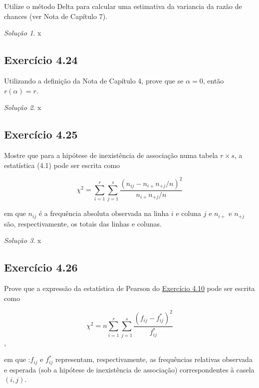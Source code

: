 \documentclass[
]{latex/krantz}
\theoremstyle{definition}
\theoremstyle{definition}
\theoremstyle{definition}
\theoremstyle{definition}
\theoremstyle{remark}
\newtheorem*{solution}{Solução}
\begin{document}
Utilize o método Delta para calcular uma estimativa da variancia da razão de chances (ver Nota de Capítulo 7).

\begin{solution}
x
\end{solution}

\hypertarget{exr4-24}{%
\subsection*{Exercício 4.24}\label{exr4-24}}

Utilizando a definição da Nota de Capítulo 4, prove que se \(\alpha = 0\), então \(r(\alpha) = r\).

\begin{solution}
x
\end{solution}

\hypertarget{exr4-25}{%
\subsection*{Exercício 4.25}\label{exr4-25}}

Mostre que para a hipótese de inexistência de associação numa tabela \(r \times s\), a estatística (4.1) pode ser escrita como

\[\chi^{2}=\sum_{i=1}^{r}\sum_{j=1}^{s}\frac{(n_{ij}-n_{i+}n_{+j}/n)^{2}}{n_{i+}n_{+j}/n}\]

em que \(n_{ij}\) é a frequência absoluta observada na linha \(i\) e coluna \(j\) e \(n_{i+}\) e \(n_{+j}\) são, respectivamente, os totais das linhas e colunas.

\begin{solution}
x
\end{solution}

\hypertarget{exr4-26}{%
\subsection*{Exercício 4.26}\label{exr4-26}}

Prove que a expressão da estatística de Pearson do \protect\hyperlink{exr4-10}{Exercício 4.10} pode ser escrita como

\[\chi^{2}=n\sum_{i=1}^{r}\sum_{j=1}^{s}\frac{(f_{ij}-f_{ij}^{*})^{2}}{f_{ij}^{*}}\],

em que :\(f_{ij}\) e \(f^{*}_{ij}\) representam, respectivamente, as frequências relativas observada e esperada (sob a hipótese de inexistência de associação) correspondentes à casela \((i, j)\).
\end{document}
